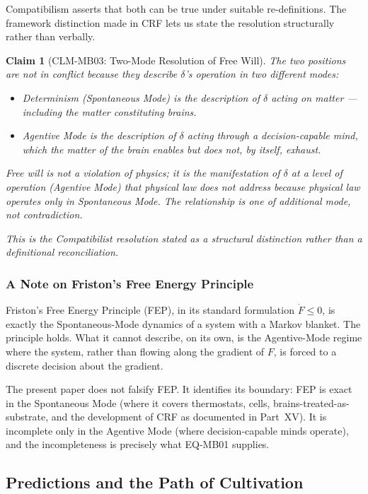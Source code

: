 \documentclass[12pt, a4paper]{article}
\newtheorem{claim}{Claim}[section]
\begin{document}
Compatibilism asserts that both can be true under suitable
re-definitions. The framework distinction made in CRF lets us state
the resolution structurally rather than verbally.

\begin{claim}[CLM-MB03: Two-Mode Resolution of Free Will]
\label{mbv1:clm:mb03}
The two positions are not in conflict because they describe
$\delta$'s operation in two different modes:
\begin{itemize}[leftmargin=*]
\item Determinism (Spontaneous Mode) is the description of $\delta$
acting on matter --- including the matter constituting brains.
\item Agentive Mode is the description of $\delta$ acting through a
decision-capable mind, which the matter of the brain enables but
does not, by itself, exhaust.
\end{itemize}
Free will is not a violation of physics; it is the manifestation of
$\delta$ at a level of operation (Agentive Mode) that physical law
does not address because physical law operates only in Spontaneous
Mode. The relationship is one of additional mode, not contradiction.

This is the Compatibilist resolution stated as a structural
distinction rather than a definitional reconciliation.
\end{claim}

\subsubsection{A Note on Friston's Free Energy Principle}

Friston's Free Energy Principle (FEP), in its standard formulation
$\dot{F} \le 0$, is exactly the Spontaneous-Mode dynamics of a system
with a Markov blanket. The principle holds. What it cannot describe,
on its own, is the Agentive-Mode regime where the system, rather than
flowing along the gradient of $F$, is forced to a discrete decision
about the gradient.

The present paper does not falsify FEP. It identifies its boundary:
FEP is exact in the Spontaneous Mode (where it covers thermostats,
cells, brains-treated-as-substrate, and the development of CRF as
documented in Part~XV). It is incomplete only in the Agentive Mode
(where decision-capable minds operate), and the incompleteness is
precisely what EQ-MB01 supplies.

\subsection{Predictions and the Path of Cultivation}
\end{document}
